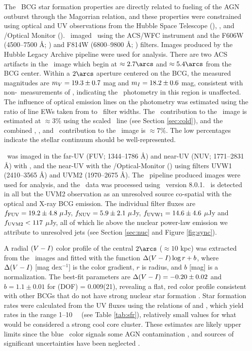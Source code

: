 \documentclass[11pt, preprint]{aastex}
\begin{document}
The \rbs\ BCG star formation properties are directly related to
fueling of the AGN outburst through the Magorrian relation, and these
properties were constrained using optical and UV observations from the
Hubble Space Telescope (\hst), \galex, and \xmm/Optical Monitor
(\xom). \hst\ imaged \rbs\ using the ACS/WFC instrument and the F606W
(4500--7500 \AA; \myv) and F814W (6800--9800 \AA; \myi)
filters. Images produced by the Hubble Legacy Archive pipeline were
used for analysis. There are two ACS artifacts in the \myi\ image
which begin at $\approx 2.7\arcs$ and $\approx 5.4\arcs$ from the BCG
center. Within a $2\arcs$ aperture centered on the BCG, the measured
magnitudes are $m_{V} = 19.3 \pm 0.7$ mag and $m_{I} = 18.2 \pm
0.6$ mag, consistent with non-\hst\ measurements of \citet{rbs1},
indicating the \hst\ photometry in this region is unaffected. The
influence of optical emission lines on the photometry was estimated
using the ratio of line EWs taken from \citet{rbs1} to \hst\ filter
widths. The \halpha\ contribution to the \myi\ image is estimated at
$\approx 3\%$ using the scaled \hbeta\ line (see Section
\ref{sec:cold}), and the combined \hbeta, \oii, and
\oiii\ contribution to the \myv\ image is $\approx 7\%$. The low
percentages indicate the stellar continuum should be well-represented.

\rbs\ was imaged in the far-UV (FUV; 1344--1786 \AA) and near-UV (NUV;
1771--2831 \AA) with \galex, and the near-UV with the
\xmm/Optical-Monitor (\xom) using filters UVW1 (2410--3565 \AA) and
UVM2 (1970--2675 \AA). The \galex\ pipeline produced images were used
for analysis, and the \xom\ data was processed using \sas\ version
8.0.1. \rbs\ is detected in all but the UVM2 observation as an
unresolved source co-spatial with the optical and X-ray BCG
emission. The individual filter fluxes are $f_{\rm{FUV}} = 19.2 \pm
4.8 ~\mu$Jy, $f_{\rm{NUV}} = 5.9 \pm 2.1 ~\mu$Jy, $f_{\rm{UVW1}} =
14.6 \pm 4.6$ $\mu$Jy and $f_{\rm{UVM2}} < 117$ $\mu$Jy, all of which
lie above the nuclear power-law emission we attribute to unresolved
jets (see Section \ref{sec:nuc} and Figure \ref{fig:sync}).

A radial $(V-I)$ color profile of the central $2\arcs$ ($\approx
10$ kpc) was extracted from the \hst\ images and fitted with the
function $\Delta(V-I) \log r + b$, where $\Delta(V-I)$
[mag dex$^{-1}$] is the color gradient, $r$ is radius, and $b$ [mag]
is a normalization. The best-fit parameters are $\Delta(V-I) =
-0.20 \pm 0.02$ and $b = 1.1 \pm 0.01$ for \chisq(DOF) = 0.009(21),
revealing a flat, red color profile consistent with other BCGs that do
not have strong nuclear star formation \citep[\eg][]{rafferty06}. Star
formation rates were calculated from the UV fluxes using the relations
of \citet{kennicutt2} and \citet{salim2007}, which yield rates in the
range 1--10 ~\msolpy\ (see Table \ref{tab:sfr}), relatively small
values for what would be considered a strong cool core cluster. These
estimates are likely upper limits since the blue \galex\ color signals
some AGN contamination \citep{2005AJ....130.1022A}, and sources of
significant uncertainties have been neglected
\citep[\eg][]{1992ApJ...388..310K, 2004AJ....127.2002K, hicksuv,
  2010MNRAS.tmp..626G}.
\end{document}
